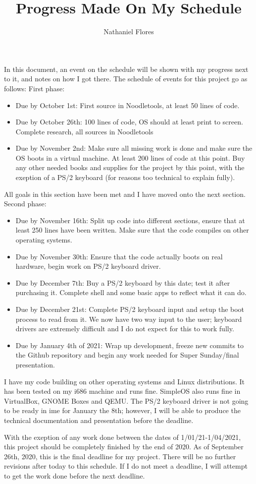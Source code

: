 \documentclass[a4paper,10pt]{article}
\title{Progress Made On My Schedule}
\author{Nathaniel Flores}
\begin{document}
\maketitle
In this document, an event on the schedule will be shown with my progress next to it, and notes on how I got there. The schedule of events for this project go as follows:
\newline
\newline
First phase:
\begin{itemize}
 \item Due by October 1st: First source in Noodletools, at least 50 lines of code.
 \item Due by October 26th: 100 lines of code, OS should at least print to screen. Complete research, all sources in Noodletools
 \item Due by November 2nd: Make sure all missing work is done and make sure the OS boots in a virtual machine. At least 200 lines of code at this point. Buy any other needed books and supplies for the project by this point, with the exeption of a PS/2 keyboard (for reasons too technical to explain fully).
\end{itemize}
All goals in this section have been met and I have moved onto the next section.
Second phase:
\begin{itemize}
 \item Due by November 16th: Split up code into different sections, ensure that at least 250 lines have been written. Make sure that the code compiles on other operating systems.
 \item Due by November 30th: Ensure that the code actually boots on real hardware, begin work on PS/2 keyboard driver.
 \item Due by December 7th: Buy a PS/2 keyboard by this date; test it after purchasing it. Complete shell and some basic apps to reflect what it can do.
 \item Due by December 21st: Complete PS/2 keyboard input and setup the boot process to read from it. We now have two way input to the user; keyboard drivers are extremely difficult and I do not expect for this to work fully.
 \item Due by January 4th of 2021: Wrap up development, freeze new commits to the Github repository and begin any work needed for Super Sunday/final presentation.
\end{itemize}
I have my code building on other operating systems and Linux distributions. It has been tested on my i686 machine and runs fine. SimpleOS also runs fine in VirtualBox, GNOME Boxes and QEMU. The PS/2 keyboard driver is not going to be ready in ime for January the 8th; however, I will be able to produce the technical documentation and presentation before the deadline. 

With the exeption of any work done between the dates of 1/01/21-1/04/2021, this project should be completely finished by the end of 2020. As of September 26th, 2020, this is the final deadline for my project. There will be no further revisions after today to this schedule. If I do not meet a deadline, I will attempt to get the work done before the next deadline.
\end{document}
